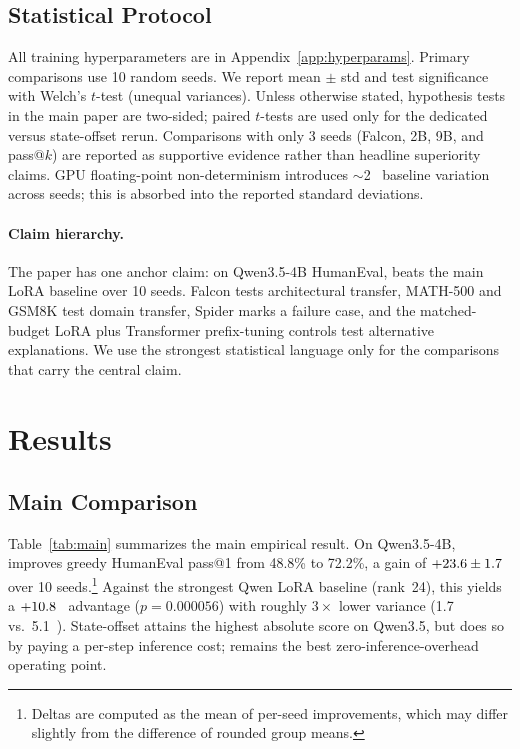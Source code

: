 \documentclass{article}
\begin{document}
\subsection{Statistical Protocol}
\label{sec:setup_stats}

All training hyperparameters are in Appendix~\ref{app:hyperparams}.
Primary comparisons use 10 random seeds. We report mean $\pm$ std and
test significance with Welch's $t$-test (unequal variances). Unless otherwise
stated, hypothesis tests in the main paper are two-sided; paired $t$-tests are
used only for the dedicated \methodshort versus state-offset rerun.
Comparisons with only 3 seeds (Falcon, 2B, 9B, and pass@$k$) are reported as
supportive evidence rather than headline superiority claims. GPU
floating-point non-determinism introduces ${\sim}$2~\pp{} baseline variation
across seeds; this is absorbed into the reported standard deviations.

\paragraph{Claim hierarchy.}
The paper has one anchor claim: on Qwen3.5-4B HumanEval, \methodshort beats the
main LoRA baseline over 10 seeds. Falcon tests architectural transfer,
MATH-500 and GSM8K test domain transfer, Spider marks a failure case, and the
matched-budget LoRA plus Transformer prefix-tuning controls test alternative
explanations. We use the strongest statistical language only for the
comparisons that carry the central claim.

\section{Results}
\label{sec:results}

\subsection{Main Comparison}
\label{sec:results_main}

Table~\ref{tab:main} summarizes the main empirical result. On Qwen3.5-4B,
\methodshort improves greedy HumanEval pass@1 from 48.8\% to 72.2\%, a gain of
$+23.6 \pm 1.7$~\pp{} over 10 seeds.\footnote{Deltas are computed as the mean of per-seed improvements, which may differ slightly from the difference of rounded group means.} Against the strongest Qwen LoRA
baseline (rank~24),
this yields a $+10.8$~\pp{} advantage ($p = 0.000056$) with roughly
$3\times$ lower variance (1.7 vs.\ 5.1~\pp). State-offset attains the highest
absolute score on Qwen3.5, but does so by paying a per-step inference cost;
\methodshort remains the best zero-inference-overhead operating point.
\end{document}
